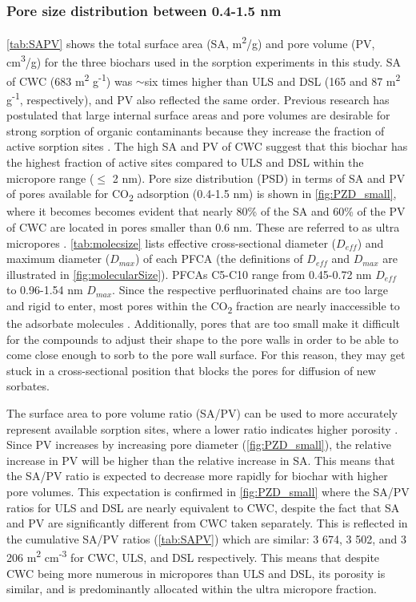 \subsubsection{Pore size distribution between 0.4-1.5 nm}
\cref{tab:SAPV} shows the total surface area (SA, m\textsuperscript{2}/g) and pore volume (PV, cm\textsuperscript{3}/g) for the three biochars used in the sorption experiments in this study. SA of CWC (683 m\textsuperscript{2} g\textsuperscript{-1}) was $\sim$six times higher than ULS and DSL (165 and 87  m\textsuperscript{2} g\textsuperscript{-1}, respectively), and PV also reflected the same order. Previous research has postulated that large internal surface areas and pore volumes are desirable for strong sorption of organic contaminants because they increase the fraction of active sorption sites \citep{ahmed2020per,Hale2016}. The high SA and PV of CWC suggest that this biochar has the highest fraction of active sites compared to ULS and DSL within the micropore range ($\le$ 2 nm). Pore size distribution (PSD) in terms of SA and PV of pores available for CO\textsubscript{2} adsorption (0.4-1.5 nm) is shown in \cref{fig:PZD_small}, where it becomes becomes evident that nearly 80\% of the SA and 60\% of the PV of CWC are located in pores smaller than 0.6 nm. These are referred to as ultra micropores \citep{bardestani2019experimental}. \cref{tab:molecsize} lists effective cross-sectional diameter ($D_{eff}$) and maximum diameter ($D_{max}$) of each PFCA (the definitions of $D_{eff}$ and $D_{max}$ are illustrated in \cref{fig:molecularSize}). PFCAs C5-C10 range from 0.45-0.72 nm $D_{eff}$ to 0.96-1.54 nm $D_{max}$. Since the respective perfluorinated chains are too large and rigid to enter, most pores within the CO\textsubscript{2} fraction are nearly inaccessible to the adsorbate molecules \citep{yu2009sorption}. Additionally, pores that are too small make it difficult for the compounds to adjust their shape to the pore walls in order to be able to come close enough to sorb to the pore wall surface. For this reason, they may get stuck in a cross-sectional position that blocks the pores for diffusion of new sorbates. 

The surface area to pore volume ratio (SA/PV) can be used to more accurately represent available sorption sites, where a lower ratio indicates higher porosity \citep{presser2011SAPV}. Since PV increases by increasing pore diameter (\cref{fig:PZD_small}), the relative increase in PV will be higher than the relative increase in SA. This means that the SA/PV ratio is expected to decrease more rapidly for biochar with higher pore volumes. This expectation is confirmed in \cref{fig:PZD_small} where the SA/PV ratios for ULS and DSL are nearly equivalent to CWC, despite the fact that SA and PV are significantly different from CWC taken separately. This is reflected in the cumulative SA/PV ratios (\cref{tab:SAPV}) which are similar: 3 674, 3 502, and 3 206 m\textsuperscript{2} cm\textsuperscript{-3} for CWC, ULS, and DSL respectively. This means that despite CWC being more numerous in micropores than ULS and DSL, its porosity is similar, and is predominantly allocated within the ultra micropore fraction.

